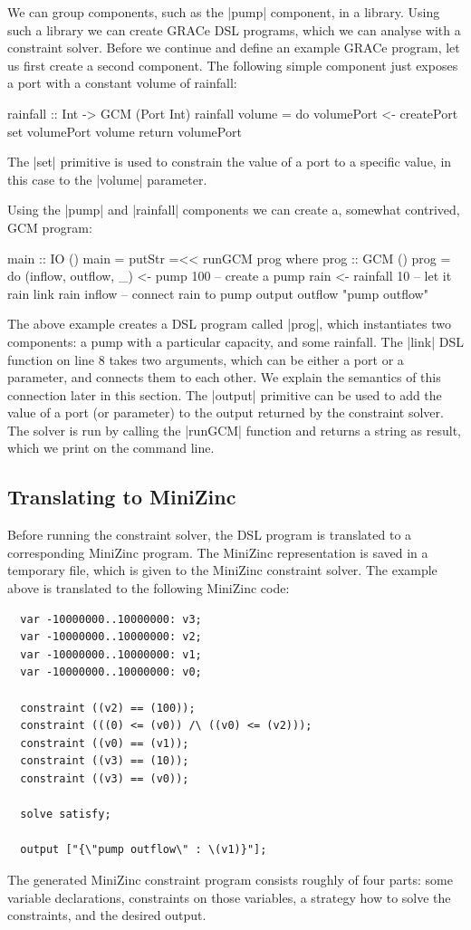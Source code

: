 \documentclass{article}
\begin{document}
We can group components, such as the |pump| component, in a library. Using such
a library we can create GRACe DSL programs, which we can analyse with a
constraint solver. Before we continue and define an example GRACe program, let
us first create a second component. The following simple component just exposes
a port with a constant volume of rainfall:
\begin{haskellcode}
rainfall :: Int -> GCM (Port Int)
rainfall volume = do
  volumePort <- createPort
  set volumePort volume
  return volumePort
\end{haskellcode}
The |set| primitive is used to constrain the value of a port to a specific value,
in this case to the |volume| parameter. 

Using the |pump| and |rainfall| components we can create a, somewhat contrived,
\ac{GCM} program:
\begin{haskellcode}
main :: IO ()
main = putStr =<< runGCM prog
  where
    prog :: GCM ()
    prog = do
      (inflow, outflow, _) <- pump 100  -- create a pump
      rain <- rainfall 10               -- let it rain
      link rain inflow                  -- connect rain to pump
      output outflow "pump outflow"
\end{haskellcode}
The above example creates a DSL program called |prog|, which instantiates two
components: a pump with a particular capacity, and some rainfall. The |link| DSL
function on line 8 takes two arguments, which can be either a port or a parameter, and
connects them to each other. We explain the semantics of this connection later in
this section. The |output| primitive can be used to add the value
of a port (or parameter) to the output returned by the constraint solver. The
solver is run by calling the |runGCM| function and returns a string as result,
which we print on the command line.

\subsection{Translating to MiniZinc}

Before running the constraint solver, the DSL program is translated to a 
corresponding MiniZinc program. The MiniZinc representation is saved in a 
temporary file, which is given to the MiniZinc constraint solver. The example 
above is translated to the following MiniZinc code:
%
\begin{verbatim}
  var -10000000..10000000: v3;
  var -10000000..10000000: v2;
  var -10000000..10000000: v1;
  var -10000000..10000000: v0;

  constraint ((v2) == (100));
  constraint (((0) <= (v0)) /\ ((v0) <= (v2)));
  constraint ((v0) == (v1));
  constraint ((v3) == (10));
  constraint ((v3) == (v0));

  solve satisfy;

  output ["{\"pump outflow\" : \(v1)}"];
\end{verbatim}
%
The generated MiniZinc constraint program consists roughly of four parts: some
variable declarations, constraints on those variables, a strategy how to solve
the constraints, and the desired output. 
\end{document}
